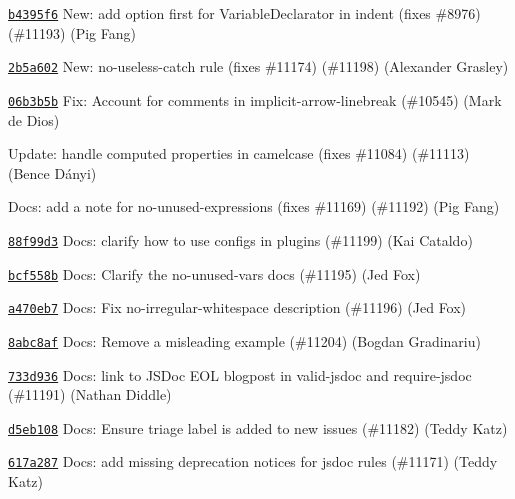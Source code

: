\begin{DoxyItemize}
\item \href{https://github.com/eslint/eslint/commit/b4395f671442a7e0be956382c24cce38025a6df6}{\texttt{ {\ttfamily b4395f6}}} New\+: add option {\ttfamily first} for Variable\+Declarator in indent (fixes \#8976) (\#11193) (Pig Fang)
\item \href{https://github.com/eslint/eslint/commit/2b5a60284670a3ab1281b206941ed38faf2ea10c}{\texttt{ {\ttfamily 2b5a602}}} New\+: no-\/useless-\/catch rule (fixes \#11174) (\#11198) (Alexander Grasley)
\item \href{https://github.com/eslint/eslint/commit/06b3b5bfcf0429c5078d4f4af3c03bb777e4f022}{\texttt{ {\ttfamily 06b3b5b}}} Fix\+: Account for comments in implicit-\/arrow-\/linebreak (\#10545) (Mark de Dios)
\item \href{https://github.com/eslint/eslint/commit/4242314215a6f35e432860433906f47af1a29724}{\texttt{ {}}} Update\+: handle computed properties in camelcase (fixes \#11084) (\#11113) (Bence Dányi)
\item \href{https://github.com/eslint/eslint/commit/100930493d9ab802a94dac5c761515b12241ddd2}{\texttt{ {}}} Docs\+: add a note for no-\/unused-\/expressions (fixes \#11169) (\#11192) (Pig Fang)
\item \href{https://github.com/eslint/eslint/commit/88f99d31b88a4cde4563bc4a6f4c41f0cc557885}{\texttt{ {\ttfamily 88f99d3}}} Docs\+: clarify how to use configs in plugins (\#11199) (Kai Cataldo)
\item \href{https://github.com/eslint/eslint/commit/bcf558b2f7036f487af2bdb2b2d34b6cdf7fc174}{\texttt{ {\ttfamily bcf558b}}} Docs\+: Clarify the no-\/unused-\/vars docs (\#11195) (Jed Fox)
\item \href{https://github.com/eslint/eslint/commit/a470eb73d52fae0f0bc48de5a487e23cf78fcfa9}{\texttt{ {\ttfamily a470eb7}}} Docs\+: Fix no-\/irregular-\/whitespace description (\#11196) (Jed Fox)
\item \href{https://github.com/eslint/eslint/commit/8abc8afe71691b747cbd1819a13d896e8aa5b92a}{\texttt{ {\ttfamily 8abc8af}}} Docs\+: Remove a misleading example (\#11204) (Bogdan Gradinariu)
\item \href{https://github.com/eslint/eslint/commit/733d93618a99758a05453ab94505a9f1330950e0}{\texttt{ {\ttfamily 733d936}}} Docs\+: link to J\+S\+Doc E\+OL blogpost in valid-\/jsdoc and require-\/jsdoc (\#11191) (Nathan Diddle)
\item \href{https://github.com/eslint/eslint/commit/d5eb108e17f676d0e4fcddeb1211b4bdfac760c1}{\texttt{ {\ttfamily d5eb108}}} Docs\+: Ensure {\ttfamily triage} label is added to new issues (\#11182) (Teddy Katz)
\item \href{https://github.com/eslint/eslint/commit/617a2874ed085bca36ca289aac55e3b7f7ce937e}{\texttt{ {\ttfamily 617a287}}} Docs\+: add missing deprecation notices for jsdoc rules (\#11171) (Teddy Katz)
\end{DoxyItemize}

